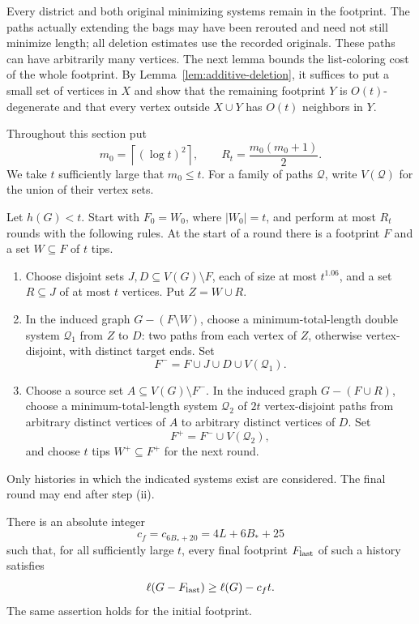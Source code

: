 Every district and both original minimizing systems remain in the
footprint. The paths actually extending the bags may have been rerouted
and need not still minimize length; all deletion estimates use the
recorded originals. These paths can have arbitrarily many vertices.
The next lemma bounds the list-coloring cost of the whole footprint.
By Lemma~\ref{lem:additive-deletion}, it suffices to put a small set of
vertices in \(X\) and show that the remaining footprint \(Y\) is
\(O(t)\)-degenerate and that every vertex outside \(X\cup Y\) has
\(O(t)\) neighbors in \(Y\).

Throughout this section put
\[
 m_0=\left\lceil(\log t)^2\right\rceil,\qquad
 R_t=\frac{m_0(m_0+1)}2.
\]
We take \(t\) sufficiently large that \(m_0\le t\).
For a family of paths \(\mathcal Q\), write \(V(\mathcal Q)\) for the
union of their vertex sets.

\begin{lemma}
\label{separate:footprint}
Let \(h(G)<t\). Start with \(F_0=W_0\), where \(|W_0|=t\), and perform
at most \(R_t\) rounds with the following rules. At the start of a round
there is a footprint \(F\) and a set \(W\subseteq F\) of \(t\) tips.
\begin{enumerate}[label=\textup{(\roman*)}]
\item Choose disjoint sets \(J,D\subseteq V(G)\setminus F\), each of
size at most \(t^{1.06}\), and a set \(R\subseteq J\) of at most \(t\)
vertices. Put \(Z=W\cup R\).
\item In the induced graph \(G-(F\setminus W)\), choose a
minimum-total-length double system \(\mathcal Q_1\) from \(Z\) to \(D\):
two paths from each vertex of \(Z\), otherwise vertex-disjoint, with
distinct target ends. Set
\[
 F^- =F\cup J\cup D\cup V(\mathcal Q_1).
\]
\item Choose a source set \(A\subseteq V(G)\setminus F^-\). In the
induced graph \(G-(F\cup R)\), choose a minimum-total-length system
\(\mathcal Q_2\) of \(2t\) vertex-disjoint paths from arbitrary distinct
vertices of \(A\) to arbitrary distinct vertices of \(D\). Set
\[
 F^+=F^-\cup V(\mathcal Q_2),
\]
and choose \(t\) tips \(W^+\subseteq F^+\) for the next round.
\end{enumerate}
Only histories in which the indicated systems exist are considered.
The final round may end after step \textup{(ii)}.

There is an absolute integer
\begin{equation}
 \label{separate:cf}
 c_f=c_{6B_*+20}=4L+6B_*+25
\end{equation}
such that, for all sufficiently large \(t\), every final footprint
\(F_{\rm last}\) of such a history satisfies
\[
 \ell(G-F_{\rm last})\ge\ell(G)-c_ft.
\]
The same assertion holds for the initial footprint.
\end{lemma}


